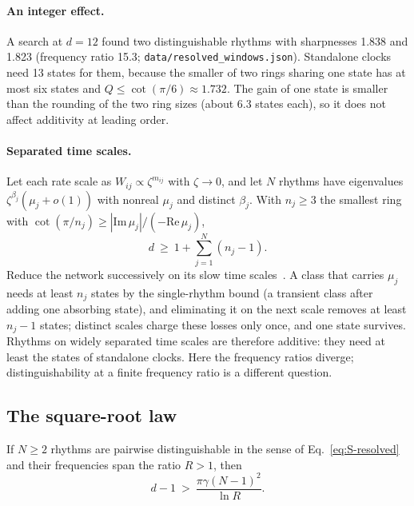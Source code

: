 \paragraph*{An integer effect.} A search at $d=12$ found two distinguishable rhythms with sharpnesses 1.838 and 1.823 (frequency ratio 15.3; \texttt{data/resolved\_windows.json}). Standalone clocks need 13 states for them, because the smaller of two rings sharing one state has at most six states and $Q\le\cot(\pi/6)\approx1.732$. The gain of one state is smaller than the rounding of the two ring sizes (about 6.3 states each), so it does not affect additivity at leading order.

\paragraph*{Separated time scales.} Let each rate scale as $W_{ij}\propto\zeta^{m_{ij}}$ with $\zeta\to0$, and let $N$ rhythms have eigenvalues $\zeta^{\beta_j}(\mu_j+o(1))$ with nonreal $\mu_j$ and distinct $\beta_j$. With $n_j\ge3$ the smallest ring with $\cot(\pi/n_j)\ge|\mathrm{Im}\,\mu_j|/(-\mathrm{Re}\,\mu_j)$,
\begin{equation}
d\ \ge\ 1+\sum_{j=1}^{N}(n_j-1).
\label{eq:S-scales}
\end{equation}
Reduce the network successively on its slow time scales~\cite{coderch1983,rohlicek1988}. A class that carries $\mu_j$ needs at least $n_j$ states by the single-rhythm bound (a transient class after adding one absorbing state), and eliminating it on the next scale removes at least $n_j-1$ states; distinct scales charge these losses only once, and one state survives. Rhythms on widely separated time scales are therefore additive: they need at least the states of standalone clocks. Here the frequency ratios diverge; distinguishability at a finite frequency ratio is a different question.

\subsection{The square-root law}\label{sec:band}

\begin{theorem}\label{thm:band}
If $N\ge2$ rhythms are pairwise distinguishable in the sense of Eq.~\eqref{eq:S-resolved} and their frequencies span the ratio $R>1$, then
\begin{equation}
d-1\ >\ \frac{\pi\gamma(N-1)^2}{\ln R}.
\label{eq:S-band}
\end{equation}
\end{theorem}

